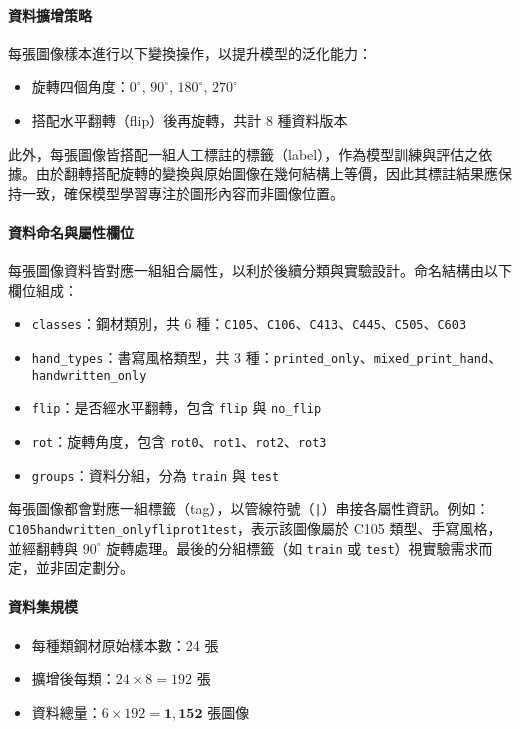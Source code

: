\documentclass[UTF8, fontset=none]{ctexart}
\begin{document}
\paragraph{資料擴增策略}
每張圖像樣本進行以下變換操作，以提升模型的泛化能力：
\begin{itemize}
  \item 旋轉四個角度：$0^\circ$, $90^\circ$, $180^\circ$, $270^\circ$
  \item 搭配水平翻轉（flip）後再旋轉，共計 8 種資料版本
\end{itemize}
此外，每張圖像皆搭配一組人工標註的標籤（label），作為模型訓練與評估之依據。由於翻轉搭配旋轉的變換與原始圖像在幾何結構上等價，因此其標註結果應保持一致，確保模型學習專注於圖形內容而非圖像位置。

\paragraph{資料命名與屬性欄位}
每張圖像資料皆對應一組組合屬性，以利於後續分類與實驗設計。命名結構由以下欄位組成：

\begin{itemize}
  \item \texttt{classes}：鋼材類別，共 6 種：\texttt{C105}、\texttt{C106}、\texttt{C413}、\texttt{C445}、\texttt{C505}、\texttt{C603}
  \item \texttt{hand\_types}：書寫風格類型，共 3 種：\texttt{printed\_only}、\texttt{mixed\_print\_hand}、\texttt{handwritten\_only}
  \item \texttt{flip}：是否經水平翻轉，包含 \texttt{flip} 與 \texttt{no\_flip}
  \item \texttt{rot}：旋轉角度，包含 \texttt{rot0}、\texttt{rot1}、\texttt{rot2}、\texttt{rot3}
  \item \texttt{groups}：資料分組，分為 \texttt{train} 與 \texttt{test}
\end{itemize}

每張圖像都會對應一組標籤（tag），以管線符號（\texttt{|}）串接各屬性資訊。例如：\texttt{C105\textbar{}handwritten\_only\textbar{}flip\textbar{}rot1\textbar{}test}，表示該圖像屬於 C105 類型、手寫風格，並經翻轉與 $90^\circ$ 旋轉處理。最後的分組標籤（如 \texttt{train} 或 \texttt{test}）視實驗需求而定，並非固定劃分。


\paragraph{資料集規模}
\begin{itemize}
  \item 每種類鋼材原始樣本數：24 張
  \item 擴增後每類：$24 \times 8 = 192$ 張
  \item 資料總量：$6 \times 192 = \mathbf{1,152}$ 張圖像
\end{itemize}
\end{document}
